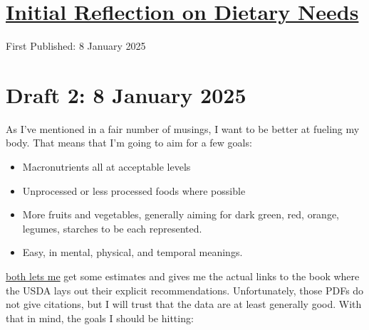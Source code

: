\documentclass[12pt]{article}[titlepage]
\renewcommand{\,}{\textsuperscript{,}}
\begin{document}
\doublespacing
\section{\href{dietary-needs.html}{Initial Reflection on Dietary Needs}}

First Published: 8 January 2025

\section{Draft 2: 8 January 2025}

As I've mentioned in a fair number of musings, I want to be better at fueling my body.  
That means that I'm going to aim for a few goals:

\begin{itemize}  
\item Macronutrients all at acceptable levels  
\item Unprocessed or less processed foods where possible  
\item More fruits and vegetables, generally aiming for dark green, red, orange, legumes, starches to be each represented.  
\item Easy, in mental, physical, and temporal meanings.  
\end{itemize}

\href{https://www.nal.usda.gov/human-nutrition-and-food-safety/dri-calculator/}{both lets me} get some estimates and gives me the actual links to the book where the USDA lays out their explicit recommendations. 
Unfortunately, those PDFs do not give citations, but I will trust that the data are at least generally good.  
With that in mind, the goals I should be hitting:
\end{document}
